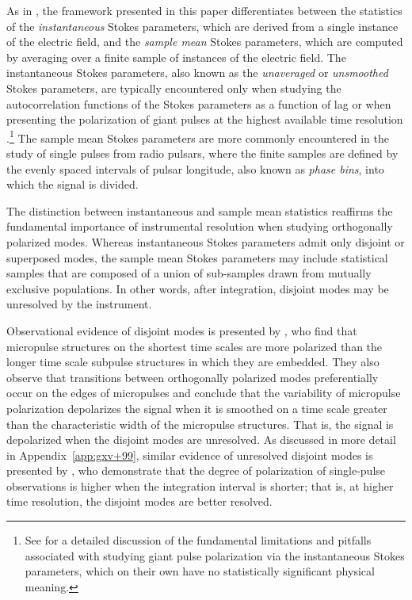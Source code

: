 \documentclass[twocolumn]{aastex6}
\newcommand{\App}[1]{Appendix~\ref{app:#1}}
\begin{document}
As in \citet{van09}, the framework presented in this paper 
differentiates between the statistics of the \emph{instantaneous}
Stokes parameters, which are derived from a single instance of the
electric field, and the \emph{sample mean} Stokes parameters, which
are computed by averaging over a finite sample of instances of the
electric field.
%
The instantaneous Stokes parameters, also known as the
\emph{unaveraged} or \emph{unsmoothed} Stokes parameters, are
typically encountered only when studying the autocorrelation functions
of the Stokes parameters as a function of lag
\citep[e.g.][]{cor76,ch77,cbh+04} or when presenting the polarization
of giant pulses at the highest available time resolution
\cite[e.g.][]{hcr70,cstt96,hkwe03}.\footnote{See \citet{van09} for a
  detailed discussion of the fundamental limitations and pitfalls
  associated with studying giant pulse polarization via the
  instantaneous Stokes parameters, which on their own have no
  statistically significant physical meaning.}
%
The sample mean Stokes parameters are more commonly encountered in the
study of single pulses from radio pulsars, where the finite samples
are defined by the evenly spaced intervals of pulsar longitude, also
known as \emph{phase bins}, into which the signal is divided.

The distinction between instantaneous and sample mean statistics
reaffirms the fundamental importance of instrumental resolution when 
studying orthogonally polarized modes.
%
Whereas instantaneous Stokes parameters admit only disjoint or
superposed modes, the sample mean Stokes parameters may include
statistical samples that are composed of a union of sub-samples drawn
from mutually exclusive populations.
%
In other words, after integration, disjoint modes may be unresolved by
the instrument.


Observational evidence of disjoint modes is presented by \cite{ch77},
who find that micropulse structures on the shortest time scales are
more polarized than the longer time scale subpulse structures in which
they are embedded.  They also observe that transitions between
orthogonally polarized modes preferentially occur on the edges of
micropulses and conclude that the variability of micropulse
polarization depolarizes the signal when it is smoothed on a time
scale greater than the characteristic width of the micropulse
structures.
%
That is, the signal is depolarized when the disjoint modes are unresolved.
%
As discussed in more detail in \App{gxv+99}, similar evidence of
unresolved disjoint modes is presented by \citet{gxv+99}, who
demonstrate that the degree of polarization of single-pulse
observations is higher when the integration interval is shorter; that
is, at higher time resolution, the disjoint modes are better resolved.
\end{document}
